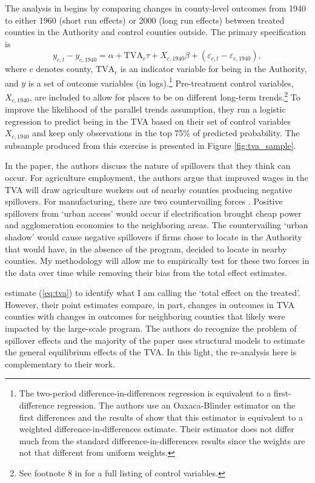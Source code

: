 The analysis in \citet{Kline_Moretti_2014a} begins by comparing changes in county-level outcomes from 1940 to either 1960 (short run effects) or 2000 (long run effects) between treated counties in the Authority and control counties outside. The primary specification is
\begin{equation}\label{eq:tva}
    y_{c, t} - y_{c, 1940} = \alpha + \text{TVA}_c \tau + X_{c, 1940} \beta + (\varepsilon_{c, t} - \varepsilon_{c, 1940}),
\end{equation}
where $c$ denotes county, $\text{TVA}_c$ is an indicator variable for being in the Authority, and $y$ is a set of outcome variables (in logs).\footnote{The two-period difference-in-differences regression is equivalent to a first-difference regression. The authors use an Oaxaca-Blinder estimator on the first differences and the results of \citet{Kline_2011} show that this estimator is equivalent to a weighted difference-in-differences estimate. Their estimator does not differ much from the standard difference-in-differences results since the weights are not that different from uniform weights.} Pre-treatment control variables, $X_{c,1940}$, are included to allow for places to be on different long-term trends.\footnote{See footnote 8 in \citet{Kline_Moretti_2014a} for a full listing of control variables.} To improve the likelihood of the parallel trends assumption, they run a logistic regression to predict being in the TVA based on their set of control variables $X_{c,1940}$ and keep only observations in the top 75\% of predicted probability. The subsample produced from this exercise is presented in Figure \ref{fig:tva_sample}. 

In the paper, the authors discuss the nature of spillovers that they think can occur. For agriculture employment, the authors argue that improved wages in the TVA will draw agriculture workers out of nearby counties producing negative spillovers. For manufacturing, there are two countervailing forces \citep{Cuberes_Desmet_Rappaport_2021}. Positive spillovers from `urban access' would occur if electrification brought cheap power and agglomeration economies to the neighboring areas. The countervailing `urban shadow' would cause negative spillovers if firms chose to locate in the Authority that would have, in the absence of the program, decided to locate in nearby counties. My methodology will allow me to empirically test for these two forces in the data over time while removing their bias from the total effect estimates. 

\citet{Kline_Moretti_2014a} estimate (\ref{eq:tva}) to identify what I am calling the `total effect on the treated'. However, their point estimates compare, in part, changes in outcomes in TVA counties with changes in outcomes for neighboring counties that likely were impacted by the large-scale program. The authors do recognize the problem of spillover effects and the majority of the paper uses structural models to estimate the general equilibrium effects of the TVA. In this light, the re-analysis here is complementary to their work. 

